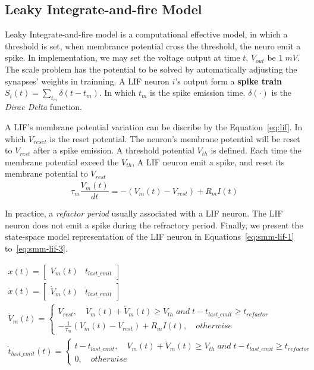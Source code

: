 \subsection{Leaky Integrate-and-fire Model}
\label{sec:current-based-lif}
Leaky Integrate-and-fire model is a computational effective model, 
in which a threshold is set, when membrance potential cross the threshold, 
the neuro emit a spike. 
In implementation, we may set the voltage output at time $t$, $V_{out}$ be $1\;mV$. 
The scale problem has the potential to be solved by automatically adjusting the synapses' weights 
in trainning.
A LIF neuron $i$'s output form a \textbf{spike train} $S_{i}(t) = \sum_{t_m}\delta(t-t_m)$.
In which $t_m$ is the spike emission time. $\delta(\cdot)$ is the \textit{Dirac Delta} function.

A LIF's membrane potential variation can be discribe by the Equation~\ref{eq:lif}.
In which $V_{reset}$ is the reset potential. The neuron's membrane potential will be reset to $V_{rest}$
after a spike emission.
A threshold potential $V_{th}$ is defined. Each time the membrane potential exceed the $V_{th}$, A
LIF neuron emit a spike, and reset its membrane potential to $V_{rest}$
\begin{equation}\label{eq:lif}
    \tau_m\frac{\dot V_m(t)}{dt} = -(V_m(t)-V_{rest}) + R_mI(t)
\end{equation}

In practice, a \textit{refactor period} usually associated with a LIF neuron. 
The LIF neuron does not emit a spike during the refractory period. 
Finally, we present the state-space model representation of the LIF neuron in Equations~\ref{eq:smm-lif-1}
to~\ref{eq:smm-lif-3}.

\begin{align}
    x(t) = \begin{bmatrix}V_m(t) & t_{last\_emit}\end{bmatrix} \label{eq:smm-lif-1} \\
    \dot x(t) = \begin{bmatrix}\dot V_m(t) & \dot t_{last\_emit}\end{bmatrix} \label{eq:smm-lif-2} \\
    \dot V_m(t) = \begin{cases}
        V_{rest}, \quad V_m(t) + \dot V_m(t) \ge V_{th}\;and\;t-t_{last\_emit}\ge t_{refactor}  \\
        -\frac{1}{\tau_m}(V_m(t)-V_{rest}) + R_mI(t),\quad otherwise
    \end{cases} \label{eq:smm-lif-3}\\
    \dot t_{last\_emit}(t) = \begin{cases}
        t-t_{last\_emit}, \quad V_m(t) + \dot V_m(t) \ge V_{th}\;and\;t-t_{last\_emit}\ge t_{refactor} \\
        0,\quad otherwise
    \end{cases} \label{eq:smm-lif-3}
\end{align}

